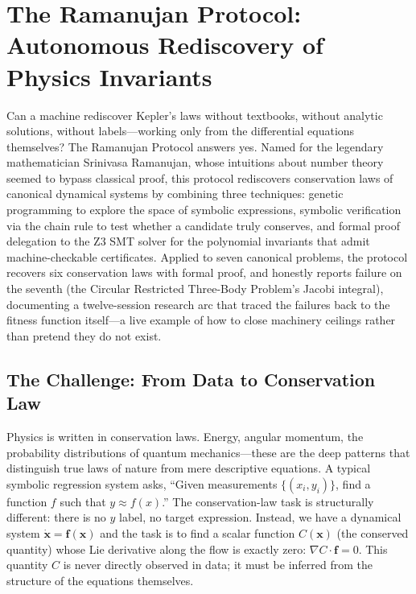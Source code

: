 %

\chapter{The Ramanujan Protocol: Autonomous Rediscovery of Physics Invariants}
\label{ch:ramanujan}

Can a machine rediscover Kepler's laws without textbooks, without analytic solutions, without labels---working only from the differential equations themselves? The Ramanujan Protocol answers yes. Named for the legendary mathematician Srinivasa Ramanujan, whose intuitions about number theory seemed to bypass classical proof, this protocol rediscovers conservation laws of canonical dynamical systems by combining three techniques: genetic programming to explore the space of symbolic expressions, symbolic verification via the chain rule to test whether a candidate truly conserves, and formal proof delegation to the Z3 SMT solver for the polynomial invariants that admit machine-checkable certificates. Applied to seven canonical problems, the protocol recovers six conservation laws with formal proof, and honestly reports failure on the seventh (the Circular Restricted Three-Body Problem's Jacobi integral), documenting a twelve-session research arc that traced the failures back to the fitness function itself---a live example of how to close machinery ceilings rather than pretend they do not exist.

\section{The Challenge: From Data to Conservation Law}

Physics is written in conservation laws. Energy, angular momentum, the probability distributions of quantum mechanics---these are the deep patterns that distinguish true laws of nature from mere descriptive equations. A typical symbolic regression system asks, ``Given measurements $\{(x_i, y_i)\}$, find a function $f$ such that $y \approx f(x)$.'' The conservation-law task is structurally different: there is no $y$ label, no target expression. Instead, we have a dynamical system $\dot{\mathbf{x}} = \mathbf{f}(\mathbf{x})$ and the task is to find a scalar function $C(\mathbf{x})$ (the conserved quantity) whose Lie derivative along the flow is exactly zero: $\nabla C \cdot \mathbf{f} = 0$. This quantity $C$ is never directly observed in data; it must be inferred from the structure of the equations themselves.

